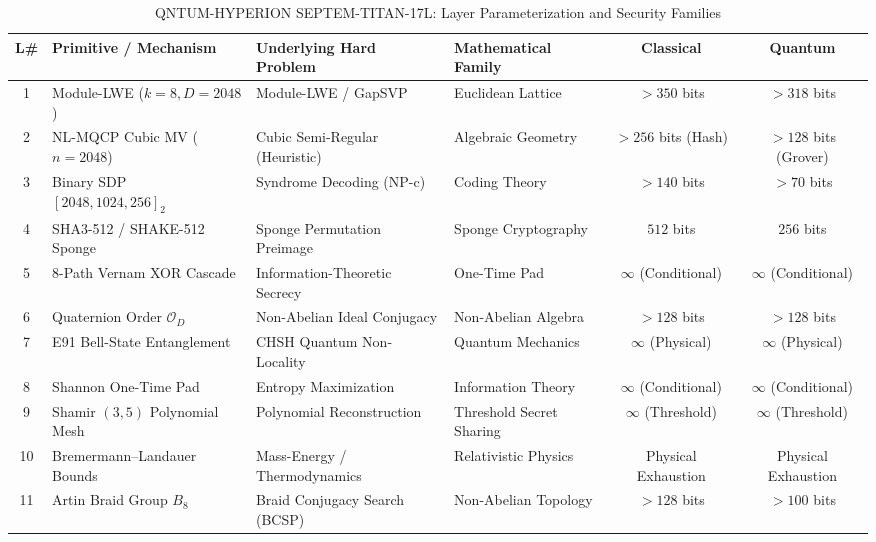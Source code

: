 \documentclass{ieeeaccess}
\newcommand{\calO}{\mathcal{O}}
\begin{document}
\begin{table}[!t]
\centering
\caption{QNTUM-HYPERION SEPTEM-TITAN-17L: Layer Parameterization and Security Families}
\label{tab:layers}
\renewcommand{\arraystretch}{1.2}
\footnotesize
\begin{tabular}{@{}c p{3.6cm} p{3.8cm} p{2.8cm} c c@{}}
\toprule
\textbf{L\#} & \textbf{Primitive / Mechanism} & \textbf{Underlying Hard Problem} & \textbf{Mathematical Family} & \textbf{Classical} & \textbf{Quantum} \\
\midrule
1  & Module-LWE ($k=8, D=2048$)      & Module-LWE / GapSVP              & Euclidean Lattice            & $>350$ bits                 & $>318$ bits                \\
2  & NL-MQCP Cubic MV ($n=2048$)     & Cubic Semi-Regular (Heuristic)   & Algebraic Geometry           & $>256$ bits (Hash)          & $>128$ bits (Grover)       \\
3  & Binary SDP $[2048, 1024, 256]_2$& Syndrome Decoding (NP-c)         & Coding Theory                & $>140$ bits                 & $>70$ bits                 \\
4  & SHA3-512 / SHAKE-512 Sponge     & Sponge Permutation Preimage       & Sponge Cryptography          & $512$ bits                  & $256$ bits                 \\
5  & 8-Path Vernam XOR Cascade       & Information-Theoretic Secrecy     & One-Time Pad                 & $\infty$ (Conditional)      & $\infty$ (Conditional)     \\
6  & Quaternion Order $\calO_D$      & Non-Abelian Ideal Conjugacy       & Non-Abelian Algebra          & $>128$ bits                 & $>128$ bits                \\
7  & E91 Bell-State Entanglement     & CHSH Quantum Non-Locality         & Quantum Mechanics            & $\infty$ (Physical)         & $\infty$ (Physical)        \\
8  & Shannon One-Time Pad            & Entropy Maximization              & Information Theory           & $\infty$ (Conditional)      & $\infty$ (Conditional)     \\
9  & Shamir $(3,5)$ Polynomial Mesh  & Polynomial Reconstruction         & Threshold Secret Sharing     & $\infty$ (Threshold)        & $\infty$ (Threshold)       \\
10 & Bremermann--Landauer Bounds     & Mass-Energy / Thermodynamics      & Relativistic Physics         & Physical Exhaustion         & Physical Exhaustion        \\
11 & Artin Braid Group $B_8$         & Braid Conjugacy Search (BCSP)     & Non-Abelian Topology         & $>128$ bits                 & $>100$ bits                \\

\end{tabular}
\end{table}
\end{document}
